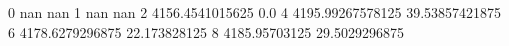 0 nan nan
1 nan nan
2 4156.4541015625 0.0
4 4195.99267578125 39.53857421875
6 4178.6279296875 22.173828125
8 4185.95703125 29.5029296875
